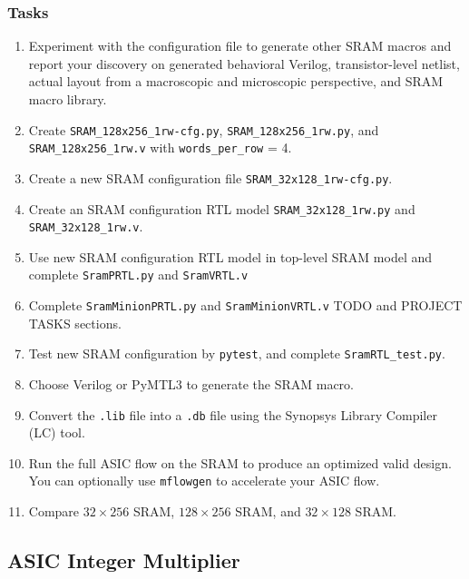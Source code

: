 \documentclass[a4paper,12pt,twoside]{article}
\begin{document}
\subsubsection{Tasks}
\begin{enumerate}
    \item Experiment with the configuration file to generate other SRAM macros and report your discovery on generated behavioral Verilog, transistor-level netlist, actual layout from a macroscopic and microscopic perspective, and SRAM macro library.
    \item Create \texttt{SRAM\_128x256\_1rw-cfg.py}, \texttt{SRAM\_128x256\_1rw.py}, and \texttt{SRAM\_128x256\_1rw.v} with \texttt{words\_per\_row} = 4.
    \item Create a new SRAM configuration file \texttt{SRAM\_32x128\_1rw-cfg.py}.
    \item Create an SRAM configuration RTL model \texttt{SRAM\_32x128\_1rw.py} and \texttt{SRAM\_32x128\_1rw.v}.
    \item Use new SRAM configuration RTL model in top-level SRAM model and complete \texttt{SramPRTL.py} and \texttt{SramVRTL.v}
    \item Complete \texttt{SramMinionPRTL.py} and \texttt{SramMinionVRTL.v} TODO and PROJECT TASKS sections.
    \item Test new SRAM configuration by \texttt{pytest}, and complete \texttt{SramRTL\_test.py}.
    \item Choose Verilog or PyMTL3 to generate the SRAM macro.
    \item Convert the \texttt{.lib} file into a \texttt{.db} file using the Synopsys Library Compiler (LC) tool.
    \item Run the full ASIC flow on the SRAM to produce an optimized valid design. You can optionally use \texttt{mflowgen} to accelerate your ASIC flow.
    \item Compare $32\times256$ SRAM, $128\times256$ SRAM, and $32\times128$ SRAM.
\end{enumerate}

\subsection{ASIC Integer Multiplier}
\end{document}
